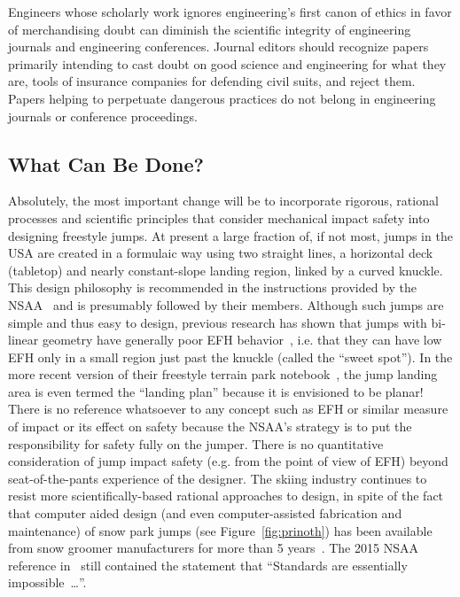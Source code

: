 \documentclass{article}
\begin{document}
Engineers whose scholarly work ignores engineering's first canon of ethics in
favor of merchandising doubt can diminish the scientific integrity of
engineering journals and engineering conferences. Journal editors should
recognize papers primarily intending to cast doubt on good science and
engineering for what they are, tools of insurance companies for defending civil
suits, and reject them. Papers helping to perpetuate dangerous practices do not
belong in engineering journals or conference proceedings.

\subsection{What Can Be Done?}
\label{sec:action}
%
Absolutely, the most important change will be to incorporate rigorous, rational
processes and scientific principles that consider mechanical impact safety into
designing freestyle jumps.  At present a large fraction of, if not most, jumps
in the USA are created in a formulaic way using two straight lines, a
horizontal deck (tabletop) and nearly constant-slope landing region, linked by
a curved knuckle. This design philosophy is recommended in the instructions
provided by the NSAA~\cite{NSAA2015} and is presumably followed by their
members. Although such jumps are simple and thus easy to design, previous
research has shown that jumps with bi-linear geometry have generally poor EFH
behavior~\cite{Swedberg2012}, i.e. that they can have low EFH only in a small
region just past the knuckle (called the ``sweet spot''). In the more recent
version of their freestyle terrain park notebook~\cite{NSAA2015}, the jump
landing area is even termed the ``landing plan'' because it is envisioned to be
planar! There is no reference whatsoever to any concept such as EFH or similar
measure of impact or its effect on safety because the NSAA's strategy is to put
the responsibility for safety fully on the jumper. There is no quantitative
consideration of jump impact safety (e.g. from the point of view of EFH) beyond
seat-of-the-pants experience of the designer. The skiing industry continues to
resist more scientifically-based rational approaches to design, in spite of the
fact that computer aided design (and even computer-assisted fabrication and
maintenance) of snow park jumps (see Figure~\ref{fig:prinoth}) has been
available from snow groomer manufacturers for more than 5
years~\cite{Muigg2019}. The 2015 NSAA reference in~\cite{NSAA2015} still
contained the statement that ``Standards are essentially impossible~\ldots''.
%
\end{document}
